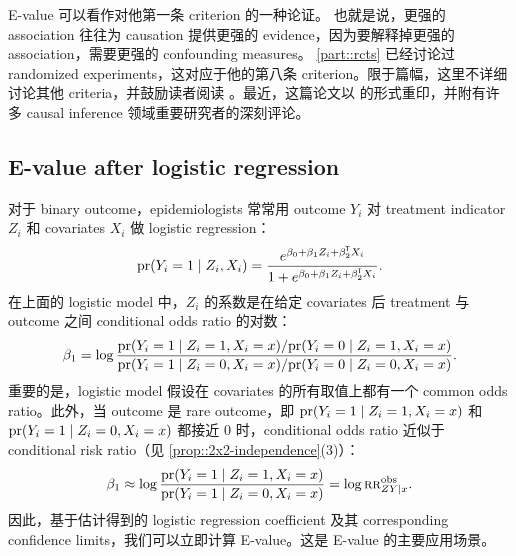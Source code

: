 E-value 可以看作对他第一条 criterion 的一种论证。
也就是说，更强的 association 往往为 causation 提供更强的 evidence，因为要解释掉更强的 association，需要更强的 confounding measures。
\cref{part::rcts} 已经讨论过 randomized experiments，这对应于他的第八条 criterion。限于篇幅，这里不详细讨论其他 criteria，并鼓励读者阅读 \citet{hill1965environment}。最近，这篇论文以 \citet{hill2020environment} 的形式重印，并附有许多 causal inference 领域重要研究者的深刻评论。




\subsection{E-value after logistic regression}

对于 binary outcome，epidemiologists 常常用 outcome $Y_i$ 对 treatment indicator $Z_i$ 和 covariates $X_i$ 做 logistic regression：
$$
\textup{pr}(Y_i = 1\mid Z_i, X_i) = \frac{  e^{\beta_0 + \beta_1 Z_i + \beta_2^{\mkern-1.5mu\mathsf{T}} X_i}  }{1  + e^{\beta_0 + \beta_1 Z_i + \beta_2^{\mkern-1.5mu\mathsf{T}} X_i}} .
$$
在上面的 logistic model 中，$Z_i$ 的系数是在给定 covariates 后 treatment 与 outcome 之间 conditional odds ratio 的对数：
$$
\beta_1 = \log \frac{   \textup{pr}(Y_i=1\mid Z_i =1, X_i=x)/  \textup{pr}(Y_i=0\mid Z_i =1, X_i=x)  }
{  \textup{pr}(Y_i=1\mid Z_i =0, X_i=x)/  \textup{pr}(Y_i=0\mid Z_i =0, X_i=x)  }  .
$$
重要的是，logistic model 假设在 covariates 的所有取值上都有一个 common odds ratio。此外，当 outcome 是 rare outcome，即 $ \textup{pr}(Y_i=1\mid Z_i =1, X_i=x)$ 和 $\textup{pr}(Y_i=1\mid Z_i =0, X_i=x)$ 都接近 $0$ 时，conditional odds ratio 近似于 conditional risk ratio（见 \cref{prop::2x2-independence}(3)）：
$$
\beta_1  \approx \log  \frac{   \textup{pr}(Y_i=1\mid Z_i =1, X_i=x)  }
{  \textup{pr}(Y_i=1\mid Z_i =0, X_i=x)  } = \log   \textsc{rr}_{ZY\mid x}^{\textup{obs}}.
$$
因此，基于估计得到的 logistic regression coefficient 及其 corresponding confidence limits，我们可以立即计算 E-value。这是 E-value 的主要应用场景。





